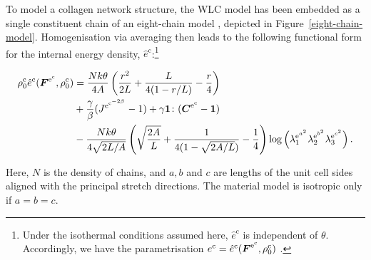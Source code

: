 To model a collagen network structure, the WLC model has been embedded
as a single constituent chain of an eight-chain model
\citep{Bischoffetal:2002, Bischoffetal1:2002}, depicted in
\mbox{Figure~\ref{eight-chain-model}}.  Homogenisation via averaging
then leads to the following functional form for the internal energy
density, $\hat{e}^\mathrm{c}$:\footnote{Under the isothermal
  conditions assumed here, $\hat{e}^\mathrm{c}$ is independent of
  $\theta$. Accordingly, we have the parametrisation
  ${e}^\mathrm{c}=\hat{e}^\mathrm{c}
  (\mbox{\boldmath$ F$}^{\mathrm{e}^\mathrm{c}},\rho^\mathrm{c}_{0})$ .}

\begin{equation}
\begin{split}
\rho^\mathrm{c}_{0}\hat{e}^\mathrm{c}
(\mbox{\boldmath$ F$}^{\mathrm{e}^\mathrm{c}},\rho^\mathrm{c}_{0}) &= \frac{N k
  \theta}{4 A}\left(\frac{r^2}{2L} + \frac{L}{4(1-r/L)} -
\frac{r}{4}\right)\\ & +
\frac{\gamma}{\beta}({J^{\mathrm{e}^{\mathrm{c}^{-2\beta}}}} -1) +
\gamma{\bf 1}\colon(\mbox{\boldmath$ C$}^{\mathrm{e}^{\mathrm{c}}}-{\bf 1})\\ &-\frac{N
  k \theta}{4\sqrt{2L/A}}\left(\sqrt{\frac{2A}{L}} + \frac{1}{4(1 -
  \sqrt{2A/L})} -\frac{1}{4} \right)
\log\left(\lambda_1^{{\mathrm{e}}^{a^\mathrm{2}}}
\lambda_2^{{\mathrm{e}}^{b^\mathrm{2}}}
\lambda_3^{{\mathrm{e}}^{c^\mathrm{2}}}\right).
\label{wlcm-energy}
\end{split}
\end{equation}

Here, $N$ is the density of chains, and $a,b$ and $c$ are lengths of
the unit cell sides aligned with the principal stretch directions. The
material model is isotropic only if $a=b=c$.

